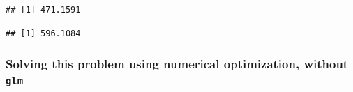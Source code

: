 \documentclass[
]{book}
\newenvironment{Shaded}{\begin{snugshade}}{\end{snugshade}}
\newcommand{\DecValTok}[1]{\textcolor[rgb]{0.00,0.00,0.81}{#1}}
\newcommand{\FunctionTok}[1]{\textcolor[rgb]{0.13,0.29,0.53}{\textbf{#1}}}
\newcommand{\NormalTok}[1]{#1}
\newcommand{\OtherTok}[1]{\textcolor[rgb]{0.56,0.35,0.01}{#1}}
\newcommand{\SpecialCharTok}[1]{\textcolor[rgb]{0.81,0.36,0.00}{\textbf{#1}}}
\begin{document}
\begin{verbatim}
## [1] 471.1591
\end{verbatim}

\begin{Shaded}
\end{Shaded}

\begin{verbatim}
## [1] 596.1084
\end{verbatim}

\subsubsection*{\texorpdfstring{Solving this problem using numerical optimization, without \texttt{glm}}{Solving this problem using numerical optimization, without glm}}\label{solving-this-problem-using-numerical-optimization-without-glm}
\end{document}
